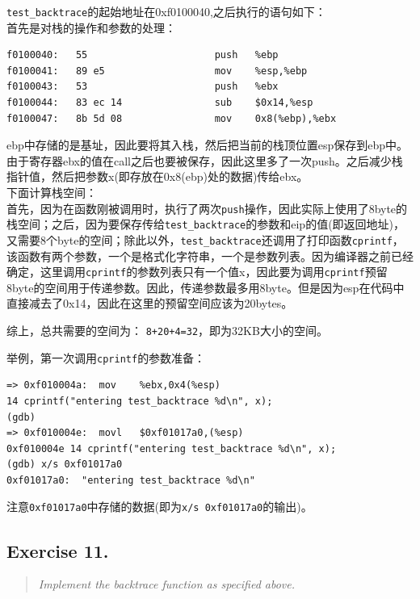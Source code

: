 \lstinline{test_backtrace}的起始地址在0xf0100040,之后执行的语句如下：\\

首先是对栈的操作和参数的处理：\\

\begin{lstlisting}[language={[x86masm]Assembler}]
f0100040:	55                   	push   %ebp
f0100041:	89 e5                	mov    %esp,%ebp
f0100043:	53                   	push   %ebx
f0100044:	83 ec 14             	sub    $0x14,%esp
f0100047:	8b 5d 08             	mov    0x8(%ebp),%ebx
\end{lstlisting}

ebp中存储的是基址，因此要将其入栈，然后把当前的栈顶位置esp保存到ebp中。由于寄存器ebx的值在call之后也要被保存，因此这里多了一次push。之后减少栈指针值，然后把参数x(即存放在0x8(ebp)处的数据)传给ebx。\\

下面计算栈空间：\\

首先，因为在函数刚被调用时，执行了两次\lstinline{push}操作，因此实际上使用了8byte的栈空间；之后，因为要保存传给\lstinline{test_backtrace}的参数和eip的值(即返回地址)，又需要8个byte的空间；除此以外，\lstinline{test_backtrace}还调用了打印函数\lstinline{cprintf}，该函数有两个参数，一个是格式化字符串，一个是参数列表。因为编译器之前已经确定，这里调用\lstinline{cprintf}的参数列表只有一个值x，因此要为调用\lstinline{cprintf}预留8byte的空间用于传递参数。因此，传递参数最多用8byte。但是因为esp在代码中直接减去了0x14，因此在这里的预留空间应该为20bytes。

综上，总共需要的空间为： \lstinline{8+20+4=32}，即为32KB大小的空间。

举例，第一次调用\lstinline{cprintf}的参数准备：
\begin{lstlisting}[language={[x86masm]Assembler}]
=> 0xf010004a:	mov    %ebx,0x4(%esp)
14 cprintf("entering test_backtrace %d\n", x);
(gdb) 
=> 0xf010004e:	movl   $0xf01017a0,(%esp)
0xf010004e 14 cprintf("entering test_backtrace %d\n", x);
(gdb) x/s 0xf01017a0
0xf01017a0:	 "entering test_backtrace %d\n"
\end{lstlisting}

注意\lstinline{0xf01017a0}中存储的数据(即为\lstinline{x/s 0xf01017a0}的输出)。

\subsection{Exercise 11.}
\begin{quote} \textit{Implement the backtrace function as specified above.} \end{quote}

